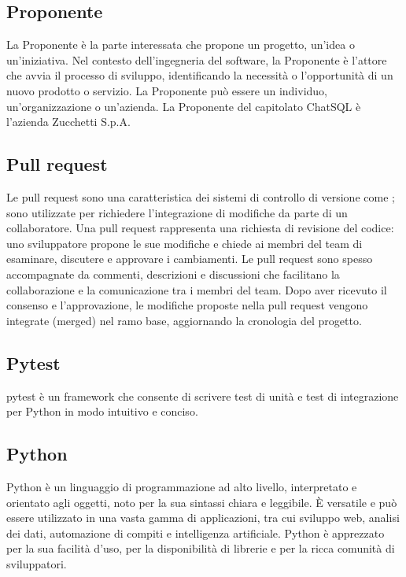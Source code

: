 \vspace{2em}
\subsection*{Proponente}
\par La Proponente è la parte interessata che propone un progetto, un'idea o un'iniziativa. Nel contesto dell'ingegneria del software, la Proponente è l'attore che avvia il processo di sviluppo, identificando la necessità o l'opportunità di un nuovo prodotto o servizio. La Proponente può essere un individuo, un'organizzazione o un'azienda. La Proponente del capitolato ChatSQL è l'azienda Zucchetti S.p.A.

\vspace{2em}
\subsection*{Pull request}
\par Le pull request sono una caratteristica dei sistemi di controllo di versione come ; sono utilizzate per richiedere l'integrazione di modifiche da parte di un collaboratore. Una pull request rappresenta una richiesta di revisione del codice: uno sviluppatore propone le sue modifiche e chiede ai membri del team di esaminare, discutere e approvare i cambiamenti. Le pull request sono spesso accompagnate da commenti, descrizioni e discussioni che facilitano la collaborazione e la comunicazione tra i membri del team. Dopo aver ricevuto il consenso e l'approvazione, le modifiche proposte nella pull request vengono integrate (merged) nel ramo base, aggiornando la cronologia del progetto.

\vspace{2em}
\subsection*{Pytest}
\par pytest è un framework che consente di scrivere test di unità e test di integrazione per Python in modo intuitivo e conciso.

\vspace{2em}
\subsection*{Python}
\par Python è un linguaggio di programmazione ad alto livello, interpretato e orientato agli oggetti, noto per la sua sintassi chiara e leggibile. È versatile e può essere utilizzato in una vasta gamma di applicazioni, tra cui sviluppo web, analisi dei dati, automazione di compiti e intelligenza artificiale. Python è apprezzato per la sua facilità d'uso, per la disponibilità di librerie e per la ricca comunità di sviluppatori.
